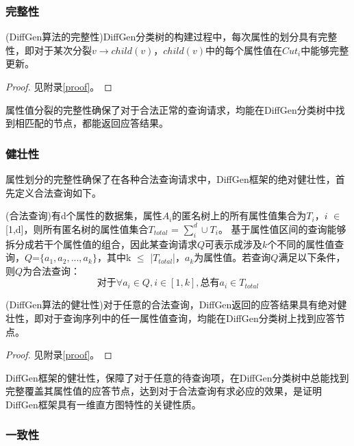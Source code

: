 \subsubsection{完整性}

\begin{prop}
	\label{chap4_prop2}
	(DiffGen算法的完整性)DiffGen分类树的构建过程中，每次属性的划分具有完整性，即对于某次分裂$v$$\rightarrow$$child(v)$，$child(v)$中的每个属性值在$Cut_{i}$中能够完整更新。
\end{prop}
\begin{proof}
	见附录\ref{proof}。
\end{proof}
属性值分裂的完整性确保了对于合法正常的查询请求，均能在DiffGen分类树中找到相匹配的节点，都能返回应答结果。

\subsubsection{健壮性}

属性划分的完整性确保了在各种合法查询请求中，DiffGen框架的绝对健壮性，首先定义合法查询如下。

\begin{defn}
	(合法查询)有d个属性的数据集，属性$A_{i}$的匿名树上的所有属性值集合为$T_{i}$，$i$ $\in$ [1,d]，则所有匿名树的属性值集合$T_{total}$ = $\sum\limits_i^d \cup T_{i}$。
	基于属性值区间的查询能够拆分成若干个属性值的组合，因此某查询请求$Q$可表示成涉及$k$个不同的属性值查询，$Q$=$\{a_{1},a_{2},...,a_{k}\}$，其中k $\leqslant$ |$T_{total}$|，$a_{k}$为属性值。若查询$Q$满足以下条件，则$Q$为合法查询：
	\begin{equation}
	\text{对于}\forall a_{i} \in Q, i \in [1,k], \text{总有}a_{i} \in T_{total}
	\end{equation}
\end{defn}

\begin{prop}
	\label{chap4_prop3}
	(DiffGen算法的健壮性)对于任意的合法查询，DiffGen返回的应答结果具有绝对健壮性，即对于查询序列中的任一属性值查询，均能在DiffGen分类树上找到应答节点。
\end{prop}
\begin{proof}
	见附录\ref{proof}。
\end{proof}

DiffGen框架的健壮性，保障了对于任意的待查询项，在DiffGen分类树中总能找到完整覆盖其属性值的应答节点，达到对于合法查询有求必应的效果，是证明DiffGen框架具有一维直方图特性的关键性质。

\subsubsection{一致性}

